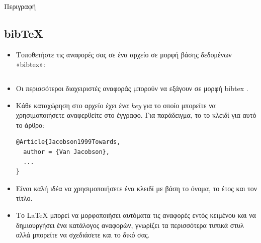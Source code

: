 \documentclass{beamer}
\begin{document}
\begin{frame}{Περιγραφή}
\begin{multicols}{2}
\tableofcontents[currentsection]
\end{multicols}
\end{frame}

\en
\subsection { bib\TeX} \gr
\begin{frame}[fragile]{\en \insertsubsection{} }
\begin{itemize}
\item Τοποθετήστε τις αναφορές σας σε ένα αρχείο \en {}\gr \space σε μορφή βάσης δεδομένων \en «bibtex»:
\inputminted[fontsize=\scriptsize,frame=single]{latex}{bib-example.bib}\gr
\item Οι περισσότεροι διαχειριστές αναφοράς μπορούν να εξάγουν σε μορφή \en bibtex \gr.
\end{itemize}
\end{frame}

\begin{frame}[fragile]{\en\insertsubsection{}}
\begin{itemize}
\item Κάθε καταχώρηση στο αρχείο \en{} \gr έχει ένα \en \emph{key} \gr για το οποίο μπορείτε να χρησιμοποιήσετε
αναφερθείτε στο έγγραφο. Για παράδειγμα, το \en {}\gr {} το κλειδί για αυτό το άρθρο:
\en
\begin{verbatim}
@Article{Jacobson1999Towards,
  author = {Van Jacobson},
  ...
}
\end{verbatim}
\gr
\item Είναι καλή ιδέα να χρησιμοποιήσετε ένα κλειδί με βάση το όνομα, το έτος και τον τίτλο.
\item Το \LaTeX{} μπορεί να μορφοποιήσει αυτόματα τις αναφορές εντός κειμένου και να δημιουργήσει ένα
κατάλογος αναφορών, γνωρίζει τα περισσότερα τυπικά στυλ αλλά μπορείτε να σχεδιάσετε και το δικό σας.
\end{itemize}
\end{frame}
\end{document}
